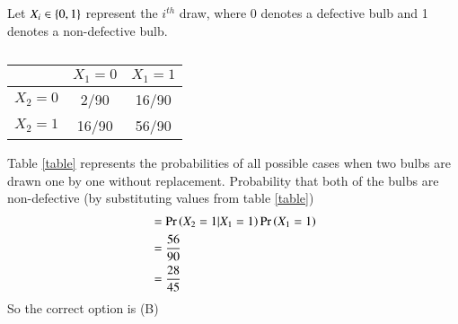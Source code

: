 Let $X_i \in \left\{0,1\right\}$ represent the $i^{th}$ draw, where 0 denotes a defective bulb and 1 denotes a non-defective bulb.
\begin{table}[h]
\centering 
\caption{}
\begin{tabular}{|c|c|c|}
\hline
           & $X_1 = 0$ & $X_1 = 1$\\
\hline
$X_2 = 0$  & 2/90      & 16/90  \\
\hline
$X_2 = 1$  & 16/90      & 56/90  \\
\hline
\end{tabular}
\label{xe2015:table}
\end{table}
 
Table \ref{table} represents the probabilities of all possible cases when two bulbs are drawn one by one without replacement.
Probability that both of the bulbs are non-defective (by substituting values from table \ref{table})
\begin{align}
    &= \Pr\left(X_2 = 1|X_1 = 1\right)\Pr\left(X_1 = 1\right)\\
    &= \dfrac{56}{90}\\
    &= \dfrac{28}{45}
\end{align}
So the correct option is (B)